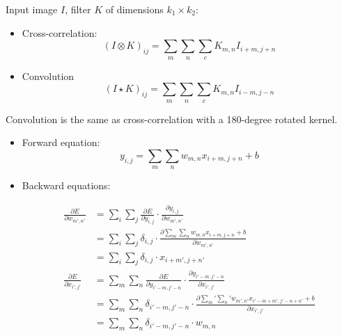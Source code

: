\documentclass[11pt]{article}
\newcommand{\0}{\mat{0}}
\begin{document}
Input image $I$, filter $K$ of dimensions $k_1 \times k_2$:
\begin{itemize}
\item Cross-correlation:
\[
	(I \otimes K)_{ij} = \sum_m \sum_n \sum_c K_{m,n} I_{i+m, j+n}
\]
\item Convolution
\[
	(I \star K)_{ij} = \sum_m \sum_n \sum_c K_{m,n} I_{i-m, j-n}
\]
\end{itemize}
Convolution is the same as cross-correlation with a 180-degree rotated kernel.


\begin{itemize}
\item Forward equation:
\[	
	y_{i,j} = \sum_m \sum_n w_{m,n} x_{i+m,j+n} + b
\]
\item Backward equations:


\begin{align*}
	\frac{\partial E}{\partial w_{m',n'}} &= \sum_i \sum_j \frac{\partial E}{\partial y_{i,j}} \cdot \frac{\partial y_{i,j}}{\partial w_{m',n'}} \\
							   &=  \sum_i \sum_j  \delta_{i,j} \cdot \frac{\partial \sum_m \sum_n w_{m,n} x_{i+m,j+n} + b} {\partial w_{m',n'}} \\
							   &=  \sum_i \sum_j  \delta_{i,j} \cdot x_{i+m', j+n'} \\
	\frac{\partial E}{\partial x_{i',j'}} 	   &= \sum_m \sum_n \frac{\partial E}{\partial y_{i'-m, j'-n}}  \cdot \frac{\partial y_{i'-m, j'-n}}{\partial x_{i',j'}} \\
							   &= \sum_m \sum_n \delta_{i'-m, j'-n} \cdot \frac{\partial  \sum_m' \sum_n' w_{m',n'} x_{i'-m+m',j'-n+n'} + b} {\partial x_{i',j'}} \\
							   &=  \sum_m \sum_n \delta_{i'-m, j'-n} \cdot w_{m,n}
\end{align*}

\end{itemize}
\end{document}
